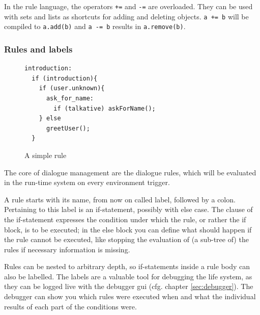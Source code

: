 
In the rule language, the operators \texttt{+=} and \texttt{-=} are
overloaded. They can be used with sets and lists as shortcuts for adding and
deleting objects. \texttt{a += b} will be compiled to \texttt{a.add(b)} and
\texttt{a -= b} results in \texttt{a.remove(b)}.

\subsubsection{Rules and labels}

\begin{figure}
\begin{small}
\begin{lstlisting}
introduction:
  if (introduction){
    if (user.unknown){
      ask_for_name:
        if (talkative) askForName();
    } else
      greetUser();
  }
\end{lstlisting}
\end{small}
\caption{A simple rule}
\end{figure}

%
The core of \vonda dialogue management are the dialogue rules, which will be
evaluated in the run-time system on every environment trigger.

A rule starts with its name, from now on called label, followed by a
colon. Pertaining to this label is an if-statement, possibly with else
case. The clause of the if-statement expresses the condition under which the
rule, or rather the if block, is to be executed; in the else block you can
define what should happen if the rule cannot be executed, like stopping the
evaluation of (a sub-tree of) the rules if necessary information is missing.

%
Rules can be nested to arbitrary depth, so if-statements inside a rule body can
also be labelled. The labels are a valuable tool for debugging the life system,
as they can be logged live with the debugger gui (cfg. chapter
\ref{sec:debugger}). The debugger can show you which rules were executed when
and what the individual results of each part of the conditions were.

